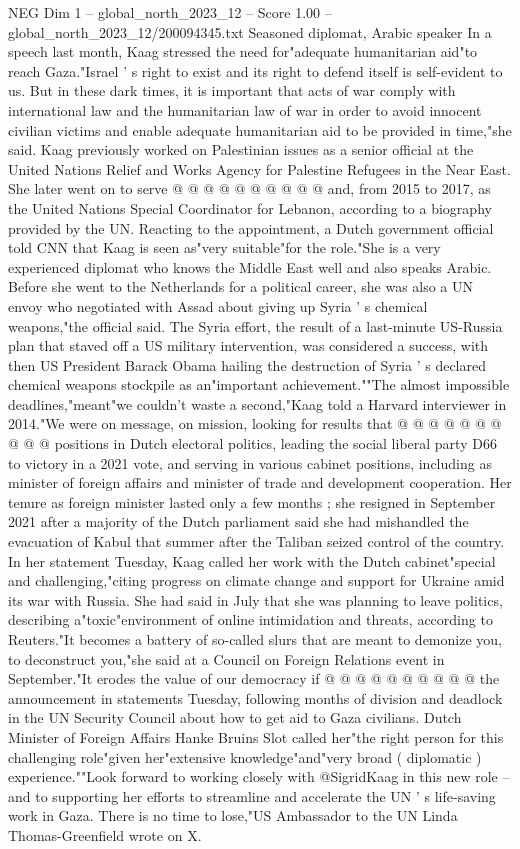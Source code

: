 \begin{textsample}{NEG Dim 1 – global\_north\_2023\_12 – Score 1.00 – global\_north\_2023\_12/200094345.txt}
Seasoned diplomat, Arabic speaker In a speech last month, Kaag stressed the need for"adequate humanitarian aid"to reach Gaza."Israel ' s right to exist and its right to defend itself is self-evident to us.
But in these dark times, it is important that acts of war comply with international law and the humanitarian law of war in order to avoid innocent civilian victims and enable adequate humanitarian aid to be provided in time,"she said.
Kaag previously worked on Palestinian issues as a senior official at the United Nations Relief and Works Agency for Palestine Refugees in the Near East.
She later went on to serve @ @ @ @ @ @ @ @ @ @ and, from 2015 to 2017, as the United Nations Special Coordinator for Lebanon, according to a biography provided by the UN.
Reacting to the appointment, a Dutch government official told CNN that Kaag is seen as"very suitable"for the role."She is a very experienced diplomat who knows the Middle East well and also speaks Arabic.
Before she went to the Netherlands for a political career, she was also a UN envoy who negotiated with Assad about giving up Syria ' s chemical weapons,"the official said.
The Syria effort, the result of a last-minute US-Russia plan that staved off a US military intervention, was considered a success, with then US President Barack Obama hailing the destruction of Syria ' s declared chemical weapons stockpile as an"important achievement.""The almost impossible deadlines,"meant"we couldn't waste a second,"Kaag told a Harvard interviewer in 2014."We were on message, on mission, looking for results that @ @ @ @ @ @ @ @ @ @ positions in Dutch electoral politics, leading the social liberal party D66 to victory in a 2021 vote, and serving in various cabinet positions, including as minister of foreign affairs and minister of trade and development cooperation.
Her tenure as foreign minister lasted only a few months ; she resigned in September 2021 after a majority of the Dutch parliament said she had mishandled the evacuation of Kabul that summer after the Taliban seized control of the country.
In her statement Tuesday, Kaag called her work with the Dutch cabinet"special and challenging,"citing progress on climate change and support for Ukraine amid its war with Russia.
She had said in July that she was planning to leave politics, describing a"toxic"environment of online intimidation and threats, according to Reuters."It becomes a battery of so-called slurs that are meant to demonize you, to deconstruct you,"she said at a Council on Foreign Relations event in September."It erodes the value of our democracy if @ @ @ @ @ @ @ @ @ @ the announcement in statements Tuesday, following months of division and deadlock in the UN Security Council about how to get aid to Gaza civilians.
Dutch Minister of Foreign Affairs Hanke Bruins Slot called her"the right person for this challenging role"given her"extensive knowledge"and"very broad ( diplomatic ) experience.""Look forward to working closely with @SigridKaag in this new role -- and to supporting her efforts to streamline and accelerate the UN ' s life-saving work in Gaza.
There is no time to lose,"US Ambassador to the UN Linda Thomas-Greenfield wrote on X.

\end{textsample}
